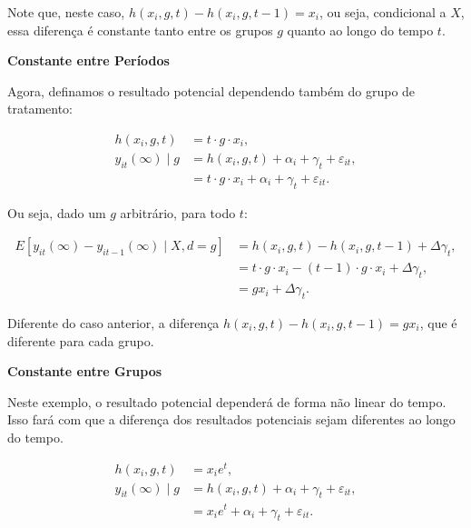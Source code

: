 \documentclass[portugues]{article}
\begin{document}
\begin{box_ex}
\noindent Note que, neste caso, $h(x_i, g, t) - h(x_i, g, t-1) = x_i$, ou seja, condicional a $X$, essa diferença é constante tanto entre os grupos $g$ quanto ao longo do tempo $t$.

\vspace{2.5mm}

\noindent \textbf{Constante entre Períodos}

\vspace{1.5mm}

Agora, definamos o resultado potencial dependendo também do grupo de tratamento:

\[
\begin{split}
    h(x_i, g, t) &= t \cdot g \cdot x_i, \\
    y_{it}(\infty) \mid g &= h(x_i, g, t) + \alpha_i + \gamma_t + \varepsilon_{it}, \\
    &= t \cdot g \cdot x_i + \alpha_i + \gamma_t + \varepsilon_{it}.
\end{split}
\]

Ou seja, dado um $g$ arbitrário, para todo $t$:

\[
\begin{split}
    E[y_{it}(\infty) - y_{it-1}(\infty) \mid X, d = g] &= h(x_i, g, t) - h(x_i, g, t-1) + \Delta \gamma_t, \\
    &= t \cdot g \cdot x_i - (t-1) \cdot g \cdot x_i + \Delta \gamma_t, \\
    &= g x_i + \Delta \gamma_t.
\end{split}
\]

Diferente do caso anterior, a diferença $h(x_i, g, t) - h(x_i, g, t-1) = g x_i$, que é diferente para cada grupo.  

\vspace{2.5mm}

\noindent\textbf{Constante entre Grupos}

\vspace{1.5mm}

Neste exemplo, o resultado potencial dependerá de forma não linear do tempo. Isso fará com que a diferença dos resultados potenciais sejam diferentes ao longo do tempo.

\[
\begin{split}
    h(x_i, g, t) &= x_ie^{t}, \\
    y_{it}(\infty) \mid g &= h(x_i, g, t) + \alpha_i + \gamma_t + \varepsilon_{it}, \\
    &= x_ie^{t} + \alpha_i + \gamma_t + \varepsilon_{it}.
\end{split}
\]


\end{box_ex}
\end{document}
